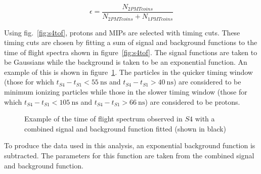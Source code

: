 	\begin{equation}
		\epsilon = \frac{N_{2PMTcoins}}{N_{2PMTcoins}+N_{1PMTcoins}}
		\label{eq:barEff}
	\end{equation}
	
	Using fig.~\ref{fig:s4tof}, protons and MIPs are selected with timing cuts. 
	These timing cuts are chosen by fitting a sum of signal and background functions to the time of flight spectra shown in figure~\ref{fig:s4tof}. 
	The signal functions are taken to be Gaussians while the background is taken to be an exponential function. 
	An example of this is shown in figure~\ref{fig:fitEx}.
	The particles in the quicker timing window (those for which $t_{S4}-t_{S1}<55~\text{ns}$ and $t_{S4}-t_{S1}>40~\text{ns}$) are considered to be minimum ionizing particles while those in the slower timing window (those for which $t_{S4}-t_{S1}<105~\text{ns}$ and $t_{S4}-t_{S1}>66~\text{ns}$) are considered to be protons.
	
	\begin{figure}[h]
		\begin{adjustbox}{max totalsize={.7\textwidth}{.62\textheight},center}
			
		\end{adjustbox}
		\caption{Example of the time of flight spectrum observed in $S4$ with a combined signal and background function fitted (shown in black)}
		\label{fig:fitEx}
	\end{figure}

	To produce the data used in this analysis, an exponential background function is subtracted. 
	The parameters for this function are taken from the combined signal and background function.

	